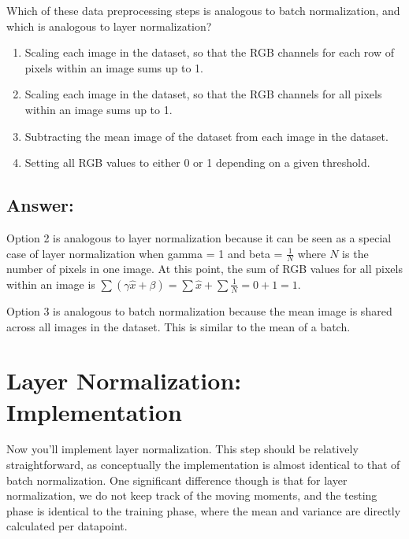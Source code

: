 \documentclass[11pt]{article}
\providecommand{\tightlist}{%
      \setlength{\itemsep}{0pt}\setlength{\parskip}{0pt}}
\begin{document}
Which of these data preprocessing steps is analogous to batch
normalization, and which is analogous to layer normalization?

\begin{enumerate}
\def\labelenumi{\arabic{enumi}.}
\tightlist
\item
  Scaling each image in the dataset, so that the RGB channels for each
  row of pixels within an image sums up to 1.
\item
  Scaling each image in the dataset, so that the RGB channels for all
  pixels within an image sums up to 1.\\
\item
  Subtracting the mean image of the dataset from each image in the
  dataset.
\item
  Setting all RGB values to either 0 or 1 depending on a given
  threshold.
\end{enumerate}

\hypertarget{answer}{%
\subsection{Answer:}\label{answer}}

Option 2 is analogous to layer normalization because it can be seen as a
special case of layer normalization when gamma = 1 and beta =
\(\frac{1}{N}\) where \(N\) is the number of pixels in one image. At
this point, the sum of RGB values for all pixels within an image is
\(\sum (\gamma \hat{x} + \beta) = \sum \hat{x} + \sum \frac{1}{N} = 0 + 1 = 1\).

Option 3 is analogous to batch normalization because the mean image is
shared across all images in the dataset. This is similar to the mean of
a batch.

    \hypertarget{layer-normalization-implementation}{%
\section{Layer Normalization:
Implementation}\label{layer-normalization-implementation}}

Now you'll implement layer normalization. This step should be relatively
straightforward, as conceptually the implementation is almost identical
to that of batch normalization. One significant difference though is
that for layer normalization, we do not keep track of the moving
moments, and the testing phase is identical to the training phase, where
the mean and variance are directly calculated per datapoint.
\end{document}
